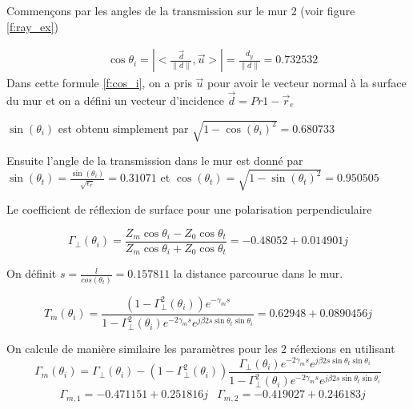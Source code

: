 \documentclass[sn-mathphys-num]{sn-jnl}
\begin{document}
Commençons par les angles de la transmission sur le mur 2 (voir figure \ref{f:ray_ex})

\begin{equation}
\label{f:cos_i}
    \begin{aligned}
    & \cos \theta_i=\left|<\frac{\vec{d}}{\|d\|}, \vec{u}>\right|=\frac{d_y}{\|d\|}=0.732532
    \end{aligned}
\end{equation}
Dans cette formule \eqref{f:cos_i}, on a pris $\vec{u}$ pour avoir
le vecteur normal à la surface du mur et on a défini un vecteur
d'incidence $\vec{d} = Pr1 - \vec{r}_e$

$\sin(\theta_i)$ est obtenu simplement par $\sqrt{1 - \cos(\theta_i)^2} = 0.680733$

Ensuite l'angle de la transmission dans le mur est donné par $\sin(\theta_t) = \frac{\sin(\theta_i)}{\sqrt{\epsilon_r}} = 0.31071$
et $\cos(\theta_t) = \sqrt{1 - \sin(\theta_t)^2} = 0.950505$

Le coefficient de réflexion de surface pour une polarisation perpendiculaire

\begin{equation}
    \Gamma_{\perp}\left(\theta_i\right)=\frac{Z_m \cos \theta_i-Z_0 \cos \theta_t}{Z_m \cos \theta_i+Z_0 \cos \theta_t} = -0.48052 + 0.014901j 
\end{equation}

On définit $s = \frac{l}{cos(\theta_t)} = 0.157811$ la distance parcourue dans le mur.

\begin{equation}
    T_m\left(\theta_i\right)=\frac{\left(1-\Gamma_{\perp}^2\left(\theta_i\right)\right) e^{-\gamma_m s}}{1-\Gamma_{\perp}^2\left(\theta_i\right) e^{-2 \gamma_m s} e^{j \beta 2 s \sin \theta_t \sin \theta_i}}=
    0.62948 + 0.0890456j
\end{equation}

On calcule de manière similaire les paramètres pour les 2 réflexions en utilisant
\begin{equation}
    \Gamma_{m}\left(\theta_i\right)=\Gamma_{\perp}\left(\theta_i\right)-\left(1-\Gamma_{\perp}^2\left(\theta_i\right)\right) \frac{\Gamma_{\perp}\left(\theta_i\right) e^{-2 \gamma_m s} e^{j \beta 2 s \sin \theta_t \sin \theta_i}}{1-\Gamma_{\perp}^2\left(\theta_i\right) e^{-2 \gamma_m s} e^{j \beta 2 s \sin \theta_t \sin \theta_i}}
\end{equation}
\begin{align}
    &\Gamma_{m,1} = -0.471151 + 0.251816j 
    &\Gamma_{m,2} = -0.419027 + 0.246183j
\end{align}
\end{document}
